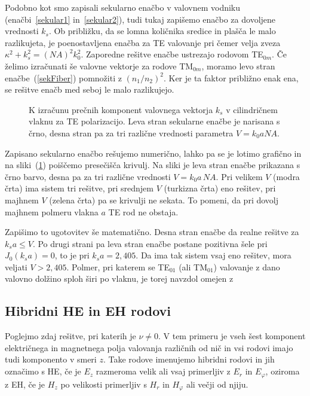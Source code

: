 Podobno kot smo zapisali sekularno enačbo v valovnem vodniku (enačbi~\ref{sekular1}
in~\ref{sekular2}), tudi tukaj zapišemo enačbo za dovoljene vrednosti $k_s$. 
Ob približku, da se lomna količnika
sredice in plašča le malo razlikujeta, je poenostavljena enačba za TE valovanje
pri čemer velja zveza $\kappa^2+k_s^2=(NA)^2k_0^2$. Zaporedne rešitve enačbe ustrezajo rodovom TE$_{0m}$. 
Če želimo izračunati še valovne vektorje za rodove TM$_{0m}$, moramo levo stran enačbe~(\ref{sekFiber}) pomnožiti z $(n_1/n_2)^2$. Ker je ta faktor približno enak ena, se rešitve enačb med seboj le malo razlikujejo.

\begin{figure}[h]
\centering
\def\svgwidth{70truemm} 

\caption{K izračunu prečnih komponent valovnega vektorja $k_s$ v 
cilindričnem vlaknu za TE polarizacijo.
Leva stran sekularne enačbe je narisana s črno, desna stran pa za tri različne vrednosti parametra 
$V=k_0aNA$.}
\label{fig:TEsecFib}
\end{figure} 
Zapisano sekularno enačbo rešujemo numerično, lahko pa se je lotimo grafično in 
na sliki~(\ref{fig:TEsecFib}) poiščemo presečišča krivulj. Na sliki je leva stran enačbe prikazana
s črno barvo, desna pa za tri različne vrednosti $V= k_0 a\,NA$. Pri velikem $V$ (modra črta) ima sistem tri 
rešitve, pri srednjem $V$ (turkizna črta) eno rešitev, pri majhnem $V$ (zelena črta) pa se krivulji
ne sekata. To pomeni, da pri dovolj majhnem polmeru vlakna $a$ TE rod ne obstaja. 

Zapišimo to ugotovitev še matematično. Desna stran enačbe da realne rešitve za 
$k_s a \le  V$. Po drugi strani pa leva stran enačbe postane pozitivna šele pri 
$J_0 (k_s a)  = 0$, to je pri $k_s a= 2,405$. Da ima tak sistem vsaj eno rešitev, mora veljati
$V>2,405$. Polmer, pri katerem se TE$_{01}$ (ali TM$_{01}$) valovanje 
z dano valovno dolžino sploh širi po vlaknu, je torej navzdol omejen z 

\subsection*{Hibridni HE in EH rodovi}
Poglejmo zdaj rešitve, pri katerih je $\nu \neq 0$. V tem primeru je 
vseh šest komponent električnega in magnetnega polja valovanja različnih od nič in vsi rodovi
imajo tudi komponento v smeri $z$. Take rodove imenujemo hibridni rodovi in jih 
označimo s HE, če je $E_z$ razmeroma velik ali vsaj primerljiv z $E_r$ in $E_\varphi$, 
oziroma z EH, če je $H_z$ po velikosti primerljiv s $H_r$ in $H_\varphi$ ali večji od njiju. 

